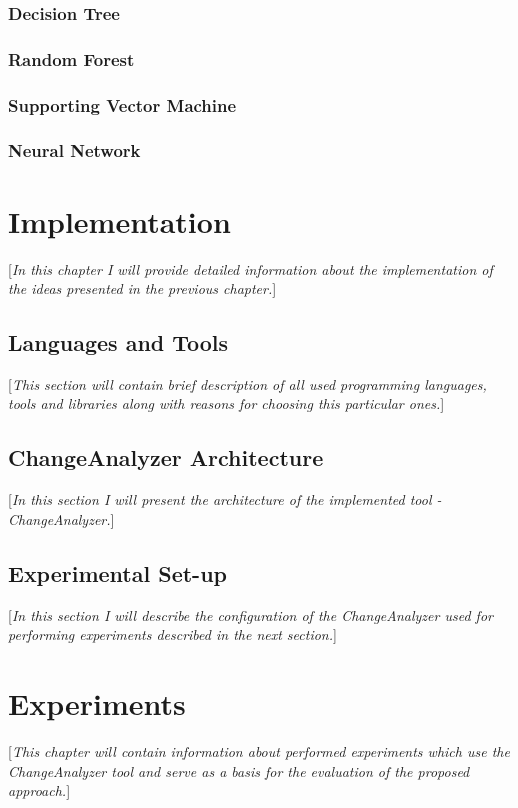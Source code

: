 \documentclass{pracamgr}
\begin{document}
\subsection{Decision Tree}

\subsection{Random Forest}

\subsection{Supporting Vector Machine}

\subsection{Neural Network}

\chapter{Implementation}
[\textit{In this chapter I will provide detailed information about the implementation of the ideas presented in the previous chapter.}]

\section{Languages and Tools}
[\textit{This section will contain brief description of all used programming languages, tools and libraries along with reasons for choosing this particular ones.}]

\section{ChangeAnalyzer Architecture}
[\textit{In this section I will present the architecture of the implemented tool - ChangeAnalyzer.}]

\section{Experimental Set-up}
[\textit{In this section I will describe the configuration of the ChangeAnalyzer used for performing experiments described in the next section.}]

\chapter{Experiments}
[\textit{This chapter will contain information about performed experiments which use the ChangeAnalyzer tool and serve as a basis for the evaluation of the proposed approach.}]
\end{document}
